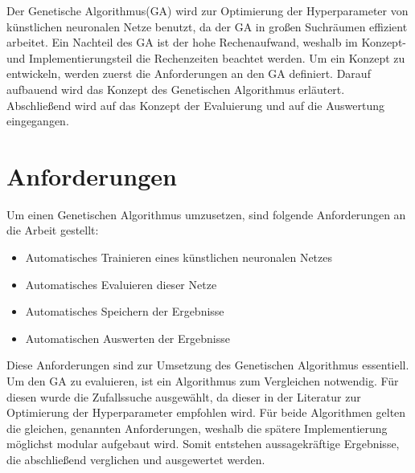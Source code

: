 Der Genetische Algorithmus(GA) wird zur Optimierung der Hyperparameter von künstlichen neuronalen Netze benutzt, da der GA in großen Suchräumen effizient arbeitet. Ein Nachteil des GA ist der hohe Rechenaufwand, weshalb im Konzept- und Implementierungsteil die Rechenzeiten beachtet werden. Um ein Konzept zu entwickeln, werden zuerst die Anforderungen an den GA definiert. Darauf aufbauend wird das Konzept des Genetischen Algorithmus erläutert. Abschließend wird auf das Konzept der Evaluierung und auf die Auswertung eingegangen.

\section{Anforderungen}
Um einen Genetischen Algorithmus umzusetzen, sind folgende Anforderungen an die Arbeit gestellt:
\begin{itemize}
\item Automatisches Trainieren eines künstlichen neuronalen Netzes
\item Automatisches Evaluieren dieser Netze
\item Automatisches Speichern der Ergebnisse
\item Automatischen Auswerten der Ergebnisse
\end{itemize}
Diese Anforderungen sind zur Umsetzung des Genetischen Algorithmus essentiell. Um den GA zu evaluieren, ist ein Algorithmus zum Vergleichen notwendig. Für diesen wurde die Zufallssuche ausgewählt, da dieser in der Literatur zur Optimierung der Hyperparameter empfohlen wird. Für beide Algorithmen gelten die gleichen, genannten Anforderungen, weshalb die spätere Implementierung möglichst modular aufgebaut wird. Somit entstehen aussagekräftige Ergebnisse, die abschließend verglichen und ausgewertet werden.  

